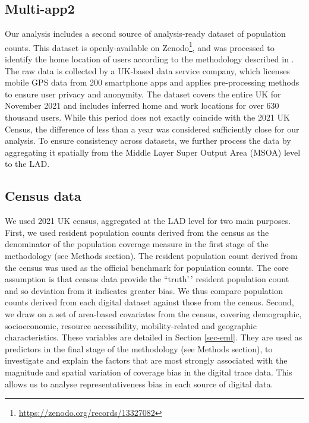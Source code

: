 \documentclass[]{rsos}%
\begin{document}
\subsection{Multi-app2}\label{multi-app2}

Our analysis includes a second source of analysis-ready dataset of
population counts. This dataset is openly-available on Zenodo\footnote{\url{https://zenodo.org/records/13327082}}, and was processed to
identify the home location of users according to the methodology
described in \citep{zhong24working}. The raw data is collected by a UK-based
data service company, which licenses mobile GPS data from 200 smartphone
apps and applies pre-processing methods to ensure user privacy and
anonymity. The dataset covers the entire UK for November 2021 and
includes inferred home and work locations for over 630 thousand users. While this
period does not exactly coincide with the 2021 UK Census, the difference
of less than a year was considered sufficiently close for our analysis.
To ensure consistency across datasets, we further process the data by
aggregating it spatially from the Middle Layer Super Output Area (MSOA)
level to the LAD.

\subsection{Census data}\label{census-data}

We used 2021 UK census, aggregated at the LAD level for two main
purposes. First, we used resident population counts derived from the
census as the denominator of the population coverage measure in the
first stage of the methodology (see Methods section). The resident
population count derived from the census was used as the official
benchmark for population counts. The core assumption is that census data provide the ``truth'\,'
resident population count and so deviation from it indicates greater bias. We thus compare population
counts derived from each digital dataset against those from the census.
Second, we draw on a set
of area-based covariates from the census, covering demographic,
socioeconomic, resource accessibility, mobility-related and geographic
characteristics. These variables are detailed in Section \ref{sec-eml}. They are used as predictors in the final stage of the
methodology (see Methods section), to investigate and explain the
factors that are most strongly associated with the magnitude and spatial
variation of coverage bias in the digital trace data. This allows us to
analyse representativeness bias in each source of digital data.
\end{document}
